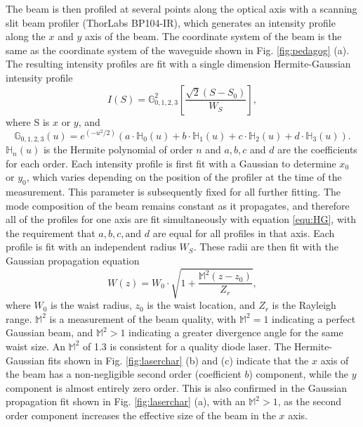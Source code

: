\documentclass[9pt,twocolumn,twoside]{pnas-new}
\begin{document}
The beam is then profiled at several points along the optical axis with a scanning slit beam profiler (ThorLabs BP104-IR), which generates an intensity profile along the $x$ and $y$ axis of the beam. The coordinate system of the beam is the same as the coordinate system of the waveguide shown in Fig. \ref{fig:pedagog} (a). The resulting intensity profiles are fit with a single dimension Hermite-Gaussian intensity profile
\begin{equation} \label{equ:HG}
	I(S) = \mathbb{G}^2_{0,1,2,3} \left[ \frac{\sqrt{2} (S - S_0)}{W_{S}} \right],
\end{equation}
where S is $x$ or $y$, and
\begin{equation*}
\mathbb{G}_{0,1,2,3}(u) = e^{\left( -u^2 / 2 \right)} (a \cdot \mathbb{H}_0(u) + b \cdot \mathbb{H}_1(u) + c \cdot\mathbb{H}_2(u) + d \cdot\mathbb{H}_3(u)).
\end{equation*}
$\mathbb{H}_n(u)$ is the Hermite polynomial of order $n$ and $a,b,c$ and $d$ are the coefficients for each order. Each intensity profile is first fit with a Gaussian to determine $x_0$ or $y_0$, which varies depending on the position of the profiler at the time of the measurement. This parameter is subsequently fixed for all further fitting. The mode composition of the beam remains constant as it propagates, and therefore all of the profiles for one axis are fit simultaneously with equation \ref{equ:HG}, with the requirement that $a,b,c, \text{and } d$ are equal for all profiles in that axis. Each profile is fit with an independent radius $W_{S}$. These radii are then fit with the Gaussian propagation equation
\begin{equation} \label{equ:GP}
	W(z) = W_0 \cdot \sqrt{1 + \frac{\mathbb{M}^2 (z - z_0)}{Z_r}},
\end{equation}
where $W_0$ is the waist radius, $z_0$ is the waist location, and $Z_r$ is the Rayleigh range. $\mathbb{M}^2$ is a measurement of the beam quality, with $\mathbb{M}^2=1$ indicating a perfect Gaussian beam, and $\mathbb{M}^2>1$ indicating a greater divergence angle for the same waist size. An $\mathbb{M}^2$ of 1.3 is consistent for a quality diode laser.
The Hermite-Gaussian fits shown in Fig. \ref{fig:laserchar} (b) and (c) indicate that the $x$ axis of the beam has a non-negligible second order (coefficient $b$) component, while the $y$ component is almost entirely zero order. This is also confirmed in the Gaussian propagation fit shown in Fig. \ref{fig:laserchar} (a), with an $\mathbb{M}^2>1$, as the second order component increases the effective size of the beam in the $x$ axis. 
\end{document}
